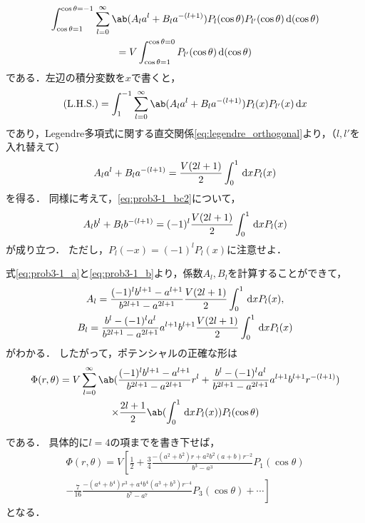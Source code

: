 \begin{multline}%
  \int_{\cos\theta=1}^{\cos\theta=-1} \sum_{l=0}^\infty\ab(A_la^l + B_la^{-(l+1)})
  P_l(\cos\theta) P_{l'}(\cos\theta) \dl{(\cos\theta)} \\
  =  V \int_{\cos\theta=1}^{\cos\theta=0} P_{l'}(\cos\theta) \dl{(\cos\theta)}
\end{multline}%
である．左辺の積分変数を$x$で書くと，
\begin{gather}%
  \text{(L.H.S.)} = \int_{1}^{-1} \sum_{l=0}^\infty\ab(A_l a^l + B_l a^{-(l+1)})
  P_l(x) P_{l'}(x) \dl{x}
\end{gather}
であり，Legendre多項式に関する直交関係\eqref{eq:legendre_orthogonal}より，（$l,l'$を入れ替えて）
\begin{gather}%
  \label{eq:prob3-1_a}
  A_l a^l + B_l a^{-(l+1)} = \frac{V(2l+1)}{2} \int_0^1 \dl{x} P_l(x)
\end{gather}%
を得る．
同様に考えて，\eqref{eq:prob3-1_bc2}について，
\begin{gather}%
  \label{eq:prob3-1_b}
  A_l b^l + B_l b^{-(l+1)} =(-1)^l \frac{V(2l+1)}{2} \int_0^{1} \dl{x} P_l(x)
\end{gather}%
が成り立つ．
ただし，$P_l(-x) = (-1)^l P_l(x)$に注意せよ．

式\eqref{eq:prob3-1_a}と\eqref{eq:prob3-1_b}より，係数$A_l, B_l$を計算することができて，
\begin{gather}%
  A_l = \frac{(-1)^lb^{l+1}-a^{l+1}}{b^{2l+1}-a^{2l+1}}
  \frac{V(2l+1)}{2} \int_0^1 \dl{x} P_l(x),\\
  B_l = \frac{b^l-(-1)^la^l}{b^{2l+1}-a^{2l+1}}a^{l+1}b^{l+1}
  \frac{V(2l+1)}{2}\int_0^1 \dl{x} P_l(x)
\end{gather}%
がわかる．
したがって，ポテンシャルの正確な形は
\begin{multline}
  \Phi(r,\theta) =
  V \sum_{l=0}^\infty \ab(
  \frac{(-1)^lb^{l+1}-a^{l+1}}{b^{2l+1}-a^{2l+1}} r^l +
  \frac{b^l-(-1)^la^l}{b^{2l+1}-a^{2l+1}}a^{l+1}b^{l+1} r^{-(l+1)}
  )\\
  \times\frac{2l+1}{2}\ab(\int_0^1 \dl{x} P_l(x))
  P_l(\cos\theta)
\end{multline}

である．
具体的に$l = 4$の項までを書き下せば，
\begin{multline}
  \Phi(r,\theta) = V \left[
    \frac{1}{2} + \frac{3}{4}\frac{-(a^2+b^2)r+a^2b^2(a+b)r^{-2}}{b^3-a^3} P_1(\cos\theta)\right.\\
    \left.
    -\frac{7}{16}\frac{-(a^4+b^4)r^3 + a^4b^4(a^3+b^3)r^{-4}}{b^7-a^7}P_3(\cos\theta) +\cdots
    \right]
\end{multline}
となる．

